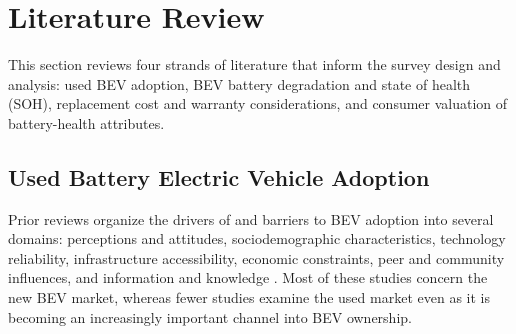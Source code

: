 \documentclass[a4paper,fleqn]{cas-sc}   %
\begin{document}



\section{Literature Review}
\label{section:lit_review}
This section reviews four strands of literature that inform the survey design and analysis: used BEV adoption, BEV battery degradation and state of health (SOH), replacement cost and warranty considerations, and consumer valuation of battery-health attributes. 

\subsection{Used Battery Electric Vehicle Adoption}

Prior reviews organize the drivers of and barriers to BEV adoption into several domains: perceptions and attitudes, sociodemographic characteristics, technology reliability, infrastructure accessibility, economic constraints, peer and community influences, and information and knowledge \parencite{yuanInvestigationRangeAnxiety2018, zouEffectsChargingInfrastructure2020, iogansenDecipheringFactorsAssociated2023a, naseriWhoMoreLikely2024, sonarExaminingCausalFactors2023, goreDCIConsumerValuation2025,iogansenConsumersPerceptionsKnowledge2026,lohawalaDeterminantsEVPurchase2026}. Most of these studies concern the new BEV market, whereas fewer studies examine the used market even as it is becoming an increasingly important channel into BEV ownership.
\end{document}
